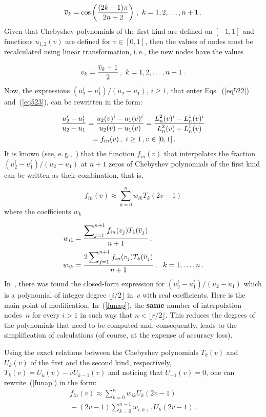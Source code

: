 \begin{multicols}{2}
\noindent
$$
\overline{v}_k = \cos \left (
\displaystyle\frac{\displaystyle (2k-1) \pi \mathstrut}{\displaystyle 2n+2\mathstrut}\right )\,, \ k=1,2, \dots ,n+1\,.
$$
Given that Chebyshev polynomials of the first kind are defined on $[-1,1]$
and functions $u_{1,2}(v)$ are defined
for $v \in [0,1]$, then the values of nodes must
be recalculated using linear transformation, i.\,e., the new nodes have the values

\noindent
$$
v_k = \displaystyle\frac{\displaystyle \overline{v}_k+1\mathstrut}{\displaystyle 2\mathstrut}\,, \ k=1,2, \dots , n+1\,.
$$
Now, the expressions $(u_2^i - u_1^i)/(u_2-u_1)$, $i \ge 1$,
that enter Eqs.~(\ref{eq522}) and~(\ref{eq523}),
can be rewritten in the form:

\noindent
\begin{multline*}
\displaystyle\frac{\displaystyle u_2^i - u_1^i\mathstrut}{\displaystyle  u_2-u_1\mathstrut}=
\displaystyle\frac{\displaystyle u_2(v)^i - u_1(v)^i \mathstrut}{\displaystyle u_2(v)-u_1(v)\mathstrut}=
\displaystyle\frac{\displaystyle L^2_n(v)^i - L^1_n(v)^i\mathstrut}{\displaystyle L^2_n(v)-L^1_n(v)\mathstrut}\\
{}=
f_{in}(v)\,, \ i \ge 1\,, v \in [0,1]\,.
\end{multline*}
\noindent 
It is known (see, e.\,g.,~\cite{cheb})
that the function $f_{in}(v)$
that interpolates the fraction $(u_2^i - u_1^i)/(u_2-u_1)$
at $n+1$ zeros of Chebyshev polynomials of the first kind
can be written as their combination, that is,

\noindent
\begin{equation}
\label{funap}
f_{in}(v) \approx \sum\limits_{k=0}^n w_{ik} T_{k}(2v-1)
\end{equation}
where the coefficients $w_{k}$

\pagebreak

\noindent
\begin{align*}
w_{i1}&=\displaystyle\frac{\displaystyle \sum\nolimits_{j=1}^{n+1} f_{in}(v_j) T_{1}(\overline{v}_j)
\mathstrut}{\displaystyle n+1\mathstrut}\,; 
\\
w_{ik}&=
\displaystyle\frac{\displaystyle 2 \sum\nolimits_{j=1}^{n+1} f_{in}(v_j) T_{k}(\overline{v}_j)
\mathstrut}{\displaystyle n+1\mathstrut}\,, \ \ k=1 ,\dots , n \,.
\end{align*}
In~\cite{aaa6}, there was found the closed-form expression
for $(u_2^i - u_1^i)/(u_2-u_1)$
which is a polynomial of integer degree $\lfloor{i/2}\rfloor$ in~$v$ with real coefficients.
{Here is the main point of modification.}
In~(\ref{funap}), the \textbf{same} number of interpolation nodes~$n$ for 
every $i>1$ in  such way that $n < \lfloor{r/2}\rfloor$. This reduces 
the degrees of the polynomials
 that need to be computed and, consequently, leads to the simplification of
 calculations (of course, at the expense of  {accuracy loss}).

Using the exact relations between the Chebyshev polynomials $T_{k}(v)$ 
and $U_{k}(v)$ of the first and the second kind, respectively, 
$T_{k}(v) = U_{k}(v) - v U_{k-1}(v)$ and noticing that $U_{-1}(v)=0$,
one can rewrite~(\ref{funap}) in the form:
\begin{multline}
\label{funap1}
f_{in}(v)\approx \sum\limits_{k=0}^n w_{ik} U_{k}(2v-1)\\
{} -
(2v-1) \sum\limits_{k=0}^{n-1} w_{i,k+1} U_{k}(2v-1)\,.
\end{multline}


\end{multicols}
